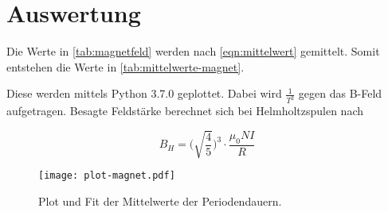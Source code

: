 \section{Auswertung}
\label{sec:Auswertung}



Die Werte in \autoref{tab:magnetfeld} werden nach \eqref{eqn:mittelwert} gemittelt. Somit entstehen die Werte in \autoref{tab:mittelwerte-magnet}.



Diese werden mittels Python 3.7.0 geplottet. Dabei wird $\frac{1}{T^2}$ gegen das B-Feld aufgetragen. Besagte Feldstärke berechnet sich bei Helmholtzspulen nach

\begin{equation}
    B_H = \bigg( \sqrt{\frac{4}{5}} \bigg)^3 \cdot \frac{\mu_0 N I}{R}
\end{equation}

\begin{figure}
  \centering
  \texttt{[image: plot-magnet.pdf]}
  \caption{Plot und Fit der Mittelwerte der Periodendauern.}
  \label{fig:plot_phase}
\end{figure}